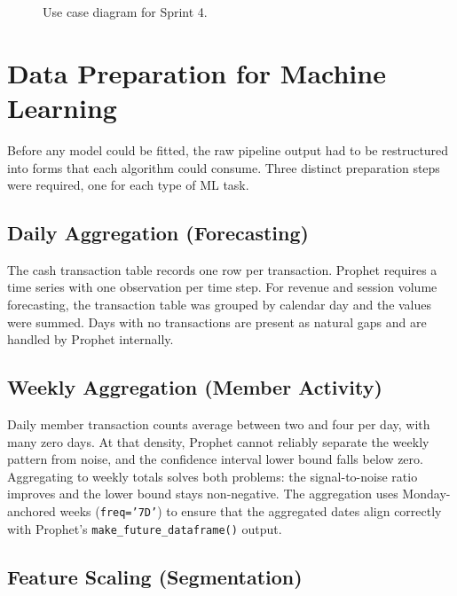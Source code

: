 \documentclass[12pt, a4paper]{report}
\begin{document}
\begin{figure}[H]
  \centering
  \caption{Use case diagram for Sprint 4.\label{fig:uc_sprint4}}
\end{figure}

\section{Data Preparation for Machine Learning}

Before any model could be fitted, the raw pipeline output had to be restructured
into forms that each algorithm could consume. Three distinct preparation steps were
required, one for each type of ML task.

\subsection{Daily Aggregation (Forecasting)}

The cash transaction table records one row per transaction. Prophet requires a
time series with one observation per time step. For revenue and session volume
forecasting, the transaction table was grouped by calendar day and the values
were summed. Days with no transactions are present as natural gaps and are handled
by Prophet internally.

\subsection{Weekly Aggregation (Member Activity)}

Daily member transaction counts average between two and four per day, with many
zero days. At that density, Prophet cannot reliably separate the weekly pattern
from noise, and the confidence interval lower bound falls below zero. Aggregating
to weekly totals solves both problems: the signal-to-noise ratio improves and the
lower bound stays non-negative. The aggregation uses Monday-anchored weeks
(\texttt{freq='7D'}) to ensure that the aggregated dates align correctly with
Prophet's \texttt{make\_future\_dataframe()} output.

\subsection{Feature Scaling (Segmentation)}
\end{document}
